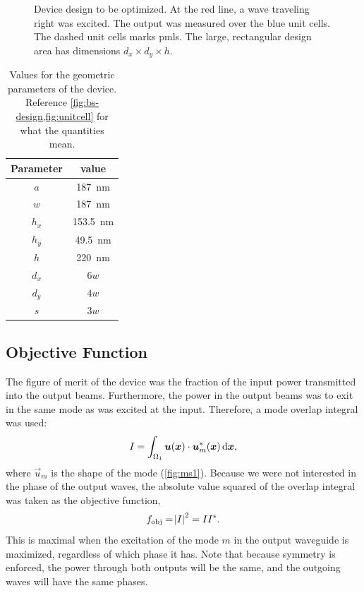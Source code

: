 \begin{figure}[htpb]
	\centering
	
	\caption{
		Device design to be optimized.
		At the red line, a wave traveling right was excited.
		The output was measured over the blue unit cells.
		The dashed unit cells marks \glspl{pml}.
		The large, rectangular design area has dimensions $d_x \times d_y \times
		h$.
	}
	\label{fig:bs-design}
\end{figure}

\begin{table}[htpb]
	\centering
	\caption{%
		Values for the geometric parameters of the device.
		Reference \cref{fig:bs-design,fig:unitcell} for what the quantities
		mean.
	}%
	\label{tab:params}

	\begin{tabular}{cc}
		\toprule
		Parameter & value\\
		\midrule
		$a$ & \qty{187}{\nm}\\
		$w$ & \qty{187}{\nm}\\
		$h_x$ & \qty{153.5}{\nm}\\
		$h_y$ & \qty{49.5}{\nm}\\
		$h$ & \qty{220}{\nm}\\
		$d_x$ & $6 w$\\
		$d_y$ & $4 w$\\
		$s$ & $3 w$\\
		\bottomrule
	\end{tabular}
\end{table}

\subsection{Objective Function}

The figure of merit of the device was the fraction of the input power transmitted
into the output beams.
Furthermore, the power in the output beams was to exit in the same mode as was
excited at the input.
Therefore, a mode overlap integral was used:
\begin{equation}
	I = \int_{\Omega_1} \vec{u}(\vec{x}) \cdot \vec{u}_m^*(\vec{x}) \dl{\vec x},
\end{equation}
where $\vec u_m$ is the shape of the mode (\cref{fig:ms1}).
Because we were not interested in the phase of the output waves,
the absolute value squared of the overlap integral was taken as the objective
function,
\begin{equation}
	f_\text{obj} = \abs{I}^2 = I I^*.
\end{equation}
This is maximal when the excitation of the mode $m$ in the output
waveguide is maximized, regardless of which phase it has.
Note that because symmetry is enforced, the power through both outputs will be
the same, and the outgoing waves will have the same phases.


